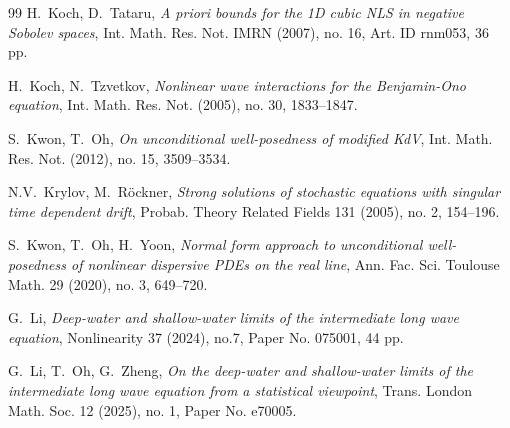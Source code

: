 \documentclass[letterpaper, 11pt,  reqno]{amsart}
\newcommand{\1}{\hspace{0.5mm}\text{I}\hspace{0.5mm}}
\numberwithin{equation}{section}
\numberwithin{theorem}{section}
\begin{document}
\begin{thebibliography}{99}
H.~Koch, D.~Tataru, 
{\it A priori bounds for the 1D cubic NLS in negative Sobolev spaces}, 
Int. Math. Res. Not. IMRN (2007), no. 16, Art. ID rnm053, 36 pp. 
 
 
H.~Koch, N.~Tzvetkov, 
{\it Nonlinear wave interactions for the Benjamin-Ono equation},
Int. Math. Res. Not. (2005), no. 30, 1833--1847. 
%
%
% 
%
 
%
%
%


%
%


%
%
%



S.~Kwon, T.~Oh, 
{\it  On unconditional well-posedness of modified KdV}, Int. Math. Res. Not. (2012), no. 15, 3509--3534. 


N.V.~Krylov,  M.~R\"ockner,
{\it Strong solutions of stochastic equations with singular time dependent drift},
Probab. Theory Related Fields 131 (2005), no. 2, 154--196. 





S.~Kwon, T.~Oh, H.~Yoon, 
{\it Normal form approach to unconditional well-posedness of nonlinear dispersive PDEs on the real line}, Ann. Fac. Sci. Toulouse Math. 29 (2020), no. 3, 649--720. 



G.~Li, 
{\it Deep-water and shallow-water limits of the intermediate long wave equation}, 
 Nonlinearity 37 (2024), no.7, Paper No. 075001, 44 pp. 
 
 
G.~Li, T.~Oh, G.~Zheng,
{\it On the deep-water and shallow-water limits of the intermediate long wave equation from a statistical viewpoint}, 
Trans. London Math. Soc. 
 12 (2025), no. 1, Paper No. e70005. 


\end{thebibliography}
\end{document}
